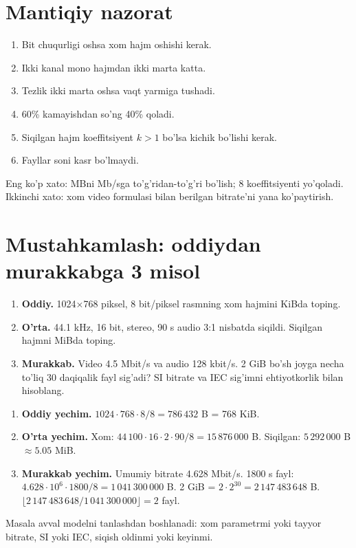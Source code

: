 \documentclass[11pt,a4paper,oneside]{book}
\begin{document}
\section{Mantiqiy nazorat}
\begin{enumerate}
\item Bit chuqurligi oshsa xom hajm oshishi kerak.
\item Ikki kanal mono hajmdan ikki marta katta.
\item Tezlik ikki marta oshsa vaqt yarmiga tushadi.
\item 60\% kamayishdan so'ng 40\% qoladi.
\item Siqilgan hajm koeffitsiyent $k>1$ bo'lsa kichik bo'lishi kerak.
\item Fayllar soni kasr bo'lmaydi.
\end{enumerate}

\begin{warningbox}
Eng ko'p xato: MBni Mb/sga to'g'ridan-to'g'ri bo'lish; 8 koeffitsiyenti yo'qoladi. Ikkinchi xato: xom video formulasi bilan berilgan bitrate'ni yana ko'paytirish.
\end{warningbox}

\section{Mustahkamlash: oddiydan murakkabga 3 misol}
\begin{taskbox}
\begin{enumerate}[leftmargin=7mm]
\item \textbf{Oddiy.} 1024$\times$768 piksel, 8 bit/piksel rasmning xom hajmini KiBda toping.
\item \textbf{O'rta.} 44.1 kHz, 16 bit, stereo, 90 s audio 3:1 nisbatda siqildi. Siqilgan hajmni MiBda toping.
\item \textbf{Murakkab.} Video 4.5 Mbit/s va audio 128 kbit/s. 2 GiB bo'sh joyga necha to'liq 30 daqiqalik fayl sig'adi? SI bitrate va IEC sig'imni ehtiyotkorlik bilan hisoblang.
\end{enumerate}
\end{taskbox}

\begin{solutionbox}
\begin{enumerate}[leftmargin=7mm]
\item \textbf{Oddiy yechim.} $1024\cdot768\cdot8/8=786\,432$ B = 768 KiB.
\item \textbf{O'rta yechim.} Xom: $44\,100\cdot16\cdot2\cdot90/8=15\,876\,000$ B. Siqilgan: $5\,292\,000$ B $\approx5.05$ MiB.
\item \textbf{Murakkab yechim.} Umumiy bitrate 4.628 Mbit/s. 1800 s fayl: $4.628\cdot10^6\cdot1800/8=1\,041\,300\,000$ B. 2 GiB = $2\cdot2^{30}=2\,147\,483\,648$ B. $\lfloor2\,147\,483\,648/1\,041\,300\,000\rfloor=2$ fayl.
\end{enumerate}
\end{solutionbox}
\begin{attest}Masala avval modelni tanlashdan boshlanadi: xom parametrmi yoki tayyor bitrate, SI yoki IEC, siqish oldinmi yoki keyinmi.\end{attest}
\end{document}
